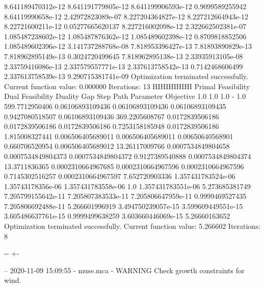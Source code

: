 \documentclass[letterpaper,10pt,english]{sphinxmanual}
\newlength\nbsphinxcodecellspacing
\begin{document}
{\begin{sphinxVerbatim}[commandchars=\\\{\}]
8.641189470312e-12  8.641191779805e-12  8.641199906593e-12  0.9099589255942  8.64119990658e-12   2.42972823089e-07
8.227204364827e-12  8.227212664943e-12  8.22721600211e-12   0.05277665620137 8.227216002098e-12  2.322662502381e-07
1.085487238602e-12  1.085487876362e-12  1.085489602398e-12  0.8709818852506  1.085489602396e-12  3.141737288768e-08
7.818953396427e-13  7.81893890829e-13   7.818962895149e-13  0.3024720499645  7.818962895138e-13  2.33935913105e-08
2.33759416086e-13   2.337579557771e-13  2.337613758542e-13  0.7142468606499  2.337613758539e-13  9.290715381741e-09
Optimization terminated successfully.
         Current function value: 0.000000
         Iterations: 13
HIHIHIHIHI
Primal Feasibility  Dual Feasibility    Duality Gap         Step             Path Parameter      Objective
1.0                 1.0                 1.0                 -                1.0                 599.7712950406
0.06106893109436    0.06106893109436    0.06106893109435    0.9427080518507  0.06106893109436    369.2205608767
0.0172839506186     0.0172839506186     0.0172839506186     0.7253158185948  0.0172839506186     1.815008327441
0.006506405689011   0.006506405689011   0.00650640568901    0.660706520954   0.006506405689012   13.26117009766
0.0007534849804658  0.0007534849804373  0.0007534849804372  0.9127389540888  0.0007534849804374  13.3711836365
0.0002310664967685  0.0002310664967596  0.0002310664967596  0.7145302516257  0.0002310664967597  7.652720903336
1.357431783524e-06  1.35743178356e-06   1.357431783558e-06  1.0              1.357431783551e-06  5.273685381749
7.205799155642e-11  7.205807383533e-11  7.205806647959e-11  0.9999469527435  7.205806692488e-11  5.266601996919
3.494750239057e-15  3.599609449551e-15  3.605486637761e-15  0.9999499638259  3.603660446069e-15  5.26660163652
Optimization terminated successfully.
         Current function value: 5.266602
         Iterations: 8
\end{sphinxVerbatim}
}

{

\kern-\sphinxverbatimsmallskipamount\kern-\baselineskip
\kern+\FrameHeightAdjust\kern-\fboxrule
\vspace{\nbsphinxcodecellspacing}

\begin{sphinxVerbatim}[commandchars=\\\{\}]
-- 2020-11-09 15:09:55 - muse.mca - WARNING
Check growth constraints for wind.

\end{sphinxVerbatim}
}
\end{document}
